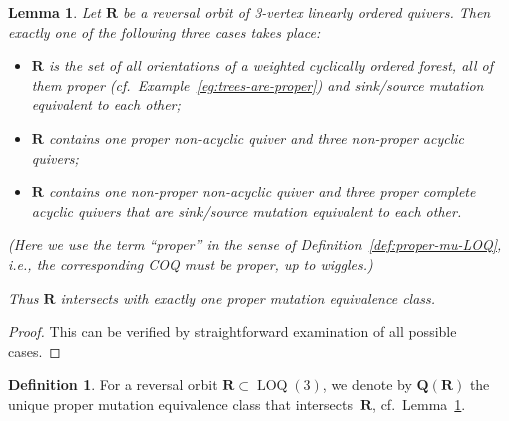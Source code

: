 \documentclass[11pt, letterpaper]{amsart}
\newtheorem{lemma}[theorem]{Lemma}
\theoremstyle{definition}
\newtheorem{definition}[theorem]{Definition}
\numberwithin{equation}{section}
\newcommand\LOQ{\operatorname{LOQ}}
\begin{document}
\begin{lemma}
\label{lem:rho-Q3}
Let $\mathbf{R}$ be a reversal orbit of 3-vertex linearly ordered quivers.
Then exactly one of the following three cases takes place:  
\begin{itemize}[leftmargin=.25in]
\item[\rm(a)] $\mathbf{R}$ is the set of all orientations of a weighted cyclically ordered forest, 
all of them proper (cf.\ Example~\ref{eg:trees-are-proper}) and sink/source mutation equivalent to each other; 
\item[\rm(b)] $\mathbf{R}$ contains one proper non-acyclic quiver and three non-proper acyclic quivers;
\item[\rm(c)] $\mathbf{R}$ contains 
one non-proper non-acyclic quiver and 
three proper complete acyclic quivers that are sink/source mutation equivalent to each other.
\end{itemize}
(Here we use the term ``proper'' in the sense of Definition~\ref{def:proper-mu-LOQ},
i.e., the corresponding COQ must be proper, up to wiggles.) 

Thus $\mathbf{R}$ intersects with exactly one proper mutation equivalence class. 
\end{lemma}

\begin{proof}
This can be verified by straightforward examination of all possible cases. 
\end{proof}

\begin{definition}
For a reversal orbit $\mathbf{R}\subset\LOQ(3)$,
we denote by $\mathbf{Q}(\mathbf{R})$ the unique proper mutation equivalence class that intersects~$\mathbf{R}$,
cf.\ Lemma~\ref{lem:rho-Q3}.
\end{definition}
\end{document}
